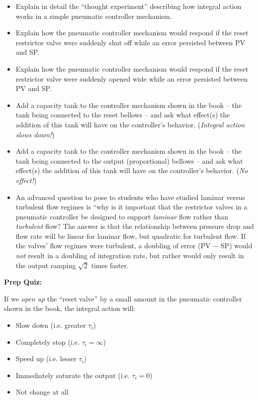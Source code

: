 \begin{itemize}
\item{} Explain in detail the ``thought experiment'' describing how integral action works in a simple pneumatic controller mechanism.
\item{} Explain how the pneumatic controller mechanism would respond if the reset restrictor valve were suddenly shut off while an error persisted between PV and SP.
\item{} Explain how the pneumatic controller mechanism would respond if the reset restrictor valve were suddenly opened wide while an error persisted between PV and SP.
\item{} Add a capacity tank to the controller mechanism shown in the book -- the tank being connected to the reset bellows -- and ask what effect(s) the addition of this tank will have on the controller's behavior.  ({\it Integral action slows down!})
\item{} Add a capacity tank to the controller mechanism shown in the book -- the tank being connected to the output (proportional) bellows -- and ask what effect(s) the addition of this tank will have on the controller's behavior.  ({\it No effect!})
\item{} An advanced question to pose to students who have studied laminar versus turbulent flow regimes is ``why is it important that the restrictor valves in a pneumatic controller be designed to support {\it laminar} flow rather than {\it turbulent} flow?  The answer is that the relationship between pressure drop and flow rate will be linear for laminar flow, but quadratic for turbulent flow.  If the valves' flow regimes were turbulent, a doubling of error (PV $-$ SP) would {\it not} result in a doubling of integration rate, but rather would only result in the output ramping $\sqrt{2}$ times faster.
\end{itemize}














\vfil \eject

\noindent
{\bf Prep Quiz:}

If we {\it open up} the ``reset valve'' by a small amount in the pneumatic controller shown in the book, the integral action will:

\begin{itemize}
\item{} Slow down (i.e. greater $\tau_i$)
\vskip 5pt 
\item{} Completely stop (i.e. $\tau_i = \infty$)
\vskip 5pt 
\item{} Speed up (i.e. lesser $\tau_i$)
\vskip 5pt 
\item{} Immediately saturate the output (i.e. $\tau_i = 0$)
\vskip 5pt 
\item{} Not change at all
\end{itemize}














